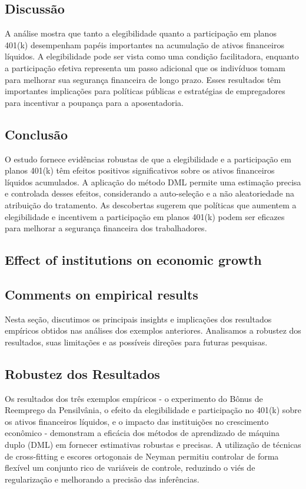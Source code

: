 \documentclass[a4paper,12pt]{article}[abntex2]
\begin{document}
\subsection*{Discussão}

A análise mostra que tanto a elegibilidade quanto a participação em planos 401(k) desempenham papéis importantes na acumulação de ativos financeiros líquidos. A elegibilidade pode ser vista como uma condição facilitadora, enquanto a participação efetiva representa um passo adicional que os indivíduos tomam para melhorar sua segurança financeira de longo prazo. Esses resultados têm importantes implicações para políticas públicas e estratégias de empregadores para incentivar a poupança para a aposentadoria.

\subsection*{Conclusão}

O estudo fornece evidências robustas de que a elegibilidade e a participação em planos 401(k) têm efeitos positivos significativos sobre os ativos financeiros líquidos acumulados. A aplicação do método DML permite uma estimação precisa e controlada desses efeitos, considerando a auto-seleção e a não aleatoriedade na atribuição do tratamento. As descobertas sugerem que políticas que aumentem a elegibilidade e incentivem a participação em planos 401(k) podem ser eficazes para melhorar a segurança financeira dos trabalhadores.

\subsection{Effect of institutions on economic growth}

\subsection{Comments on empirical results}

Nesta seção, discutimos os principais insights e implicações dos resultados empíricos obtidos nas análises dos exemplos anteriores. Analisamos a robustez dos resultados, suas limitações e as possíveis direções para futuras pesquisas.

\subsection*{Robustez dos Resultados}

Os resultados dos três exemplos empíricos - o experimento do Bônus de Reemprego da Pensilvânia, o efeito da elegibilidade e participação no 401(k) sobre os ativos financeiros líquidos, e o impacto das instituições no crescimento econômico - demonstram a eficácia dos métodos de aprendizado de máquina duplo (DML) em fornecer estimativas robustas e precisas. A utilização de técnicas de cross-fitting e escores ortogonais de Neyman permitiu controlar de forma flexível um conjunto rico de variáveis de controle, reduzindo o viés de regularização e melhorando a precisão das inferências.
\end{document}
